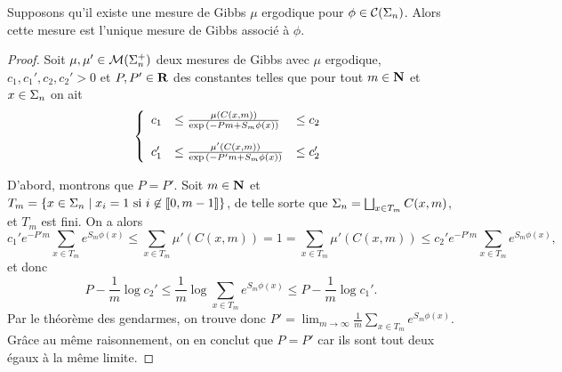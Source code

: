   \begin{proposition} \label{prop:unique}
    Supposons qu'il existe une mesure de Gibbs $\mu$ ergodique pour $\phi \in \mathcal{C} (\Sigma_{n})$.
    Alors cette mesure est l'unique mesure de Gibbs associé à $\phi$.
  \end{proposition}

  \begin{proof}
    Soit $\mu, \mu' \in \mathcal{M} (\Sigma_{n}^+)$ deux mesures de Gibbs avec $\mu$ ergodique, $c_1, c_1', c_2, c_2' > 0$ et $P, P' \in \mathbf R$
    des constantes telles que pour tout $m \in \mathbf N$ et $x \in \Sigma_n$ on ait
    $$\left\{\begin{array}{lll}
	c_1  &\leq \frac{\mu(C(x,m))}{\exp{(-Pm + S_m\phi(x))}} &\leq c_2 \vspace{1em} \\
	c_1' &\leq \frac{\mu'(C(x,m))}{\exp{(-P'm + S_m\phi(x))}} &\leq c_2'
      \end{array}\right.$$

      D'abord, montrons que $P = P'$.
      Soit $m \in \mathbf N$ et $T_m = \left\{x \in \Sigma_n \mid x_i = 1 \text{ si } i \not\in \llbracket 0, m-1 \rrbracket \right\}$,
      de telle sorte que $\Sigma_n = \bigsqcup_{x\in T_m}{C(x,m)}$, et $T_m$ est fini.
      On a alors
      $$c_1'e^{-P'm}\sum_{x\in T_m}{e^{S_m\phi(x)}} \leq \sum_{x\in T_m}{\mu'(C(x,m))}
            = 1 = \sum_{x\in T_m}{\mu'(C(x, m))} \leq c_2'e^{-P'm}\sum_{x\in T_m}{e^{S_m\phi(x)}},$$
      et donc
      $$P - \frac 1 m \log{c_2'} \leq \frac 1 m \log{\sum_{x\in T_m}{e^{S_m\phi(x)}}} \leq P - \frac 1 m \log{c_1'}.$$
      Par le théorème des gendarmes, on trouve donc $P' = \lim_{m\to\infty}{\frac 1 m\sum_{x\in T_m}{e^{S_m\phi(x)}}}$.
      Grâce au même raisonnement, on en conclut que $P = P'$ car ils sont tout deux égaux à la même limite.


\end{proof}
